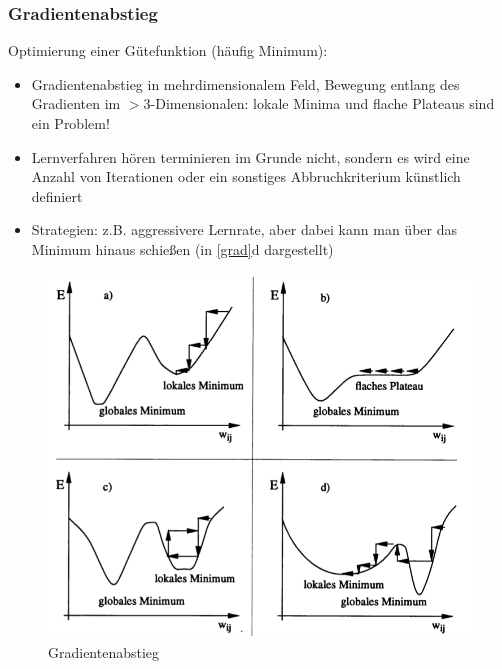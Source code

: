 \subsubsection{Gradientenabstieg}
Optimierung einer Gütefunktion (häufig Minimum): 
\begin{itemize}
\item Gradientenabstieg in mehrdimensionalem Feld, Bewegung  entlang des Gradienten im $> 3$-Dimensionalen: lokale Minima und flache Plateaus sind ein Problem!
\item Lernverfahren hören terminieren im Grunde nicht, sondern es wird eine Anzahl von Iterationen oder ein sonstiges Abbruchkriterium künstlich definiert
\item Strategien: z.B. aggressivere Lernrate, aber dabei kann man über das Minimum hinaus schießen (in \autoref{grad}d dargestellt)
\end{itemize}
\begin{figure}[h!]
	\centering
	\includegraphics[width=.7\textwidth]{figures/gradientenabstieg.png}
	\caption{Gradientenabstieg}
	\label{grad}
\end{figure}
